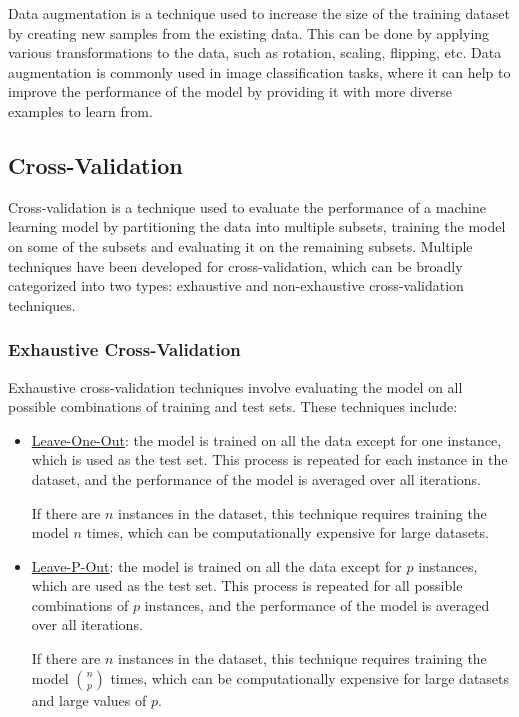 Data augmentation is a technique used to increase the size of the training dataset by creating new samples from the existing data. This can be done by applying various transformations to the data, such as rotation, scaling, flipping, etc. Data augmentation is commonly used in image classification tasks, where it can help to improve the performance of the model by providing it with more diverse examples to learn from.

\subsection{Cross-Validation}
Cross-validation is a technique used to evaluate the performance of a machine learning model by partitioning the data into multiple subsets, training the model on some of the subsets and evaluating it on the remaining subsets. Multiple techniques have been developed for cross-validation, which can be broadly categorized into two types: exhaustive and non-exhaustive cross-validation techniques.

\subsubsection{Exhaustive Cross-Validation}
Exhaustive cross-validation techniques involve evaluating the model on all possible combinations of training and test sets. These techniques include:
\begin{itemize}
    \item \ul{Leave-One-Out}: the model is trained on all the data except for one instance, which is used as the test set. This process is repeated for each instance in the dataset, and the performance of the model is averaged over all iterations.
    
    If there are $n$ instances in the dataset, this technique requires training the model $n$ times, which can be computationally expensive for large datasets.
    \item \ul{Leave-P-Out}: the model is trained on all the data except for $p$ instances, which are used as the test set. This process is repeated for all possible combinations of $p$ instances, and the performance of the model is averaged over all iterations.
    
    If there are $n$ instances in the dataset, this technique requires training the model $\binom{n}{p}$ times, which can be computationally expensive for large datasets and large values of $p$.
\end{itemize}

